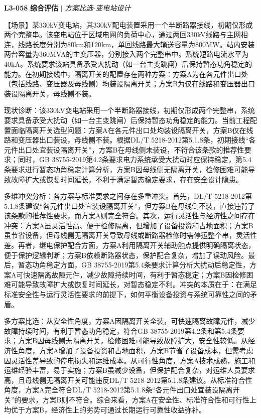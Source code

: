 \documentclass[11pt,a4paper]{ctexart}
\begin{document}
\noindent\textbf{L3-058} \hfill \textbf{综合评估} $|$ \textit{方案比选-变电站设计}
\begin{description}[leftmargin=1.5em,style=nextline,font=\normalfont]
  \item[Q:] 【场景】某330kV变电站，其330kV配电装置采用一个半断路器接线，初期仅形成两个完整串。该变电站位于区域电网的负荷中心，通过两回330kV线路与主网相连，线路长度分别为80km和120km，单回线路最大输送容量为800MW。站内安装两台容量为360MVA的主变压器，分别接入两个完整串中。系统短路电流水平为40kA。系统要求该站具备承受大扰动（如一台主变跳闸）后保持暂态功角稳定的能力。在初期接线中，隔离开关的配置存在两种方案：方案A为在各元件出口处（包括线路、变压器及母线侧）均装设隔离开关；方案B为仅在线路和变压器出口装设隔离开关，母线侧不装。
  \item[A:] 现状诊断：该330kV变电站采用一个半断路器接线，初期仅形成两个完整串，系统要求具备承受大扰动（如一台主变跳闸）后保持暂态功角稳定的能力。当前工程配置面临隔离开关选型问题：方案A在各元件出口处均装设隔离开关，方案B仅在线路和变压器出口装设，母线侧不装。根据DL/T 5218-2012第5.1.8条，初期接线“各元件出口处宜装设隔离开关”，方案B在母线侧未装设，不符合该条款的推荐性要求；同时，GB 38755-2019第4.2条要求电力系统承受大扰动时应保持稳定，第5.4条要求进行暂态功角稳定计算分析，方案B因母线侧无隔离开关，检修困难可能导致故障扩大或恢复时间延长，不利于满足暂态稳定要求，存在安全设计隐患。

多维冲突分析：各方案与标准要求之间存在多重冲突。首先，DL/T 5218-2012第5.1.8条建议“各元件出口处宜装设隔离开关”，但方案B在母线侧不装，直接违背了该条款的推荐性要求，而方案A则完全符合。其次，运行灵活性与经济性之间存在冲突：方案A虽灵活性高、便于检修隔离，但增加了设备投资和占地面积；方案B虽节省设备，但母线侧无隔离开关导致母线或断路器检修时需停运整个串，灵活性差。再者，继电保护配合方面，方案A利用隔离开关辅助触点提供明确隔离状态，便于保护逻辑判断；方案B依赖断路器状态，保护配合复杂，增加了误动风险。最后，暂态功角稳定方面，GB 38755-2019第5.4条要求计算分析大扰动后稳定性，方案A可快速隔离故障元件，减少故障持续时间，有利于暂态稳定；方案B因检修困难可能导致故障扩大或恢复时间延长，对暂态稳定不利。冲突的本质在于：在满足标准安全性与运行灵活性要求的前提下，如何平衡设备投资与系统可靠性之间的矛盾。

多方案比选：从安全性角度，方案A因隔离开关全装，可快速隔离故障元件，减少故障持续时间，有利于暂态功角稳定，符合GB 38755-2019第4.2条和第5.4条要求；方案B因母线侧无隔离开关，检修困难可能导致故障扩大，安全性较低。从经济性角度，方案A增加了设备投资和占地面积，方案B节省了设备成本，但需考虑因灵活性差导致的停电损失和运维成本。从可行性角度，方案A技术成熟，施工和运维经验丰富，易于实施；方案B虽减少设备，但保护配合复杂，对运维人员要求高，且母线侧无隔离开关可能违反DL/T 5218-2012第5.1.8条建议。从标准符合性角度，方案A完全符合DL/T 5218-2012第5.1.8条“各元件出口处宜装设隔离开关”的要求，方案B则不符合。综合来看，方案A在安全性、标准符合性和可行性上均优于方案B，经济性上的劣势可通过长期运行可靠性收益弥补。


\end{description}
\end{document}
